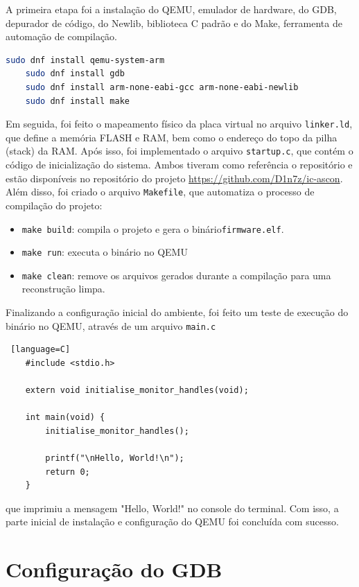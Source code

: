 \documentclass[12pt,a4paper]{article}
\begin{document}
A primeira etapa foi a instalação do QEMU, emulador de hardware, do GDB, depurador de código, do Newlib, biblioteca C padrão e do Make, ferramenta de automação de compilação.
\begin{lstlisting}[language=bash]
    sudo dnf install qemu-system-arm 
    sudo dnf install gdb 
    sudo dnf install arm-none-eabi-gcc arm-none-eabi-newlib 
    sudo dnf install make
\end{lstlisting} 
Em seguida, foi feito o mapeamento físico da placa virtual no arquivo \texttt{linker.ld}, que define a memória FLASH e RAM, bem como o endereço do topo da pilha (stack) da RAM. Após isso, foi implementado o arquivo 
\texttt{startup.c}, que contém o código de inicialização do sistema. Ambos tiveram como referência o repositório \cite{cortexm_baremetal} e estão disponíveis no repositório do projeto \url{https://github.com/D1n7z/ic-ascon}.
Além disso, foi criado o arquivo \texttt{Makefile}, que automatiza o processo de compilação do projeto:
\begin{itemize}
    \item \texttt{make build}: compila o projeto e gera o binário\texttt{firmware.elf}.
    \item \texttt{make run}: executa o binário no QEMU
    \item \texttt{make clean}: remove os arquivos gerados durante a compilação para uma reconstrução limpa.
\end{itemize}
Finalizando a configuração inicial do ambiente, foi feito um teste de execução do binário no QEMU, através de um arquivo \texttt{main.c} 
\begin{lstlisting} [language=C]
    #include <stdio.h>

    extern void initialise_monitor_handles(void);

    int main(void) {
        initialise_monitor_handles();

        printf("\nHello, World!\n");
        return 0;
    }
\end{lstlisting}
que imprimiu a mensagem "Hello, World!" no console do terminal. Com isso, a parte inicial de instalação e configuração do QEMU foi concluída com sucesso.


\section{Configuração do GDB}
\end{document}
